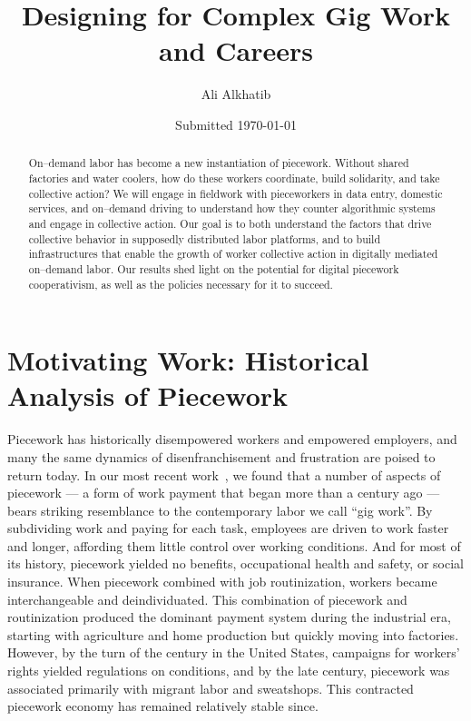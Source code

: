 \documentclass{article}
\title{Designing for Complex Gig Work and Careers}
\author{Ali Alkhatib}
\date{Submitted \today}
\newcommand{\topic}[1]{{\color{Blue}#1}}
\begin{document}
  \begin{abstract}
On--demand labor has become a new instantiation of piecework.
Without shared factories and water coolers,
how do these workers coordinate,
build solidarity,
and take collective action?
We will engage in fieldwork with pieceworkers in data entry,
domestic services,
and on--demand driving to understand how they counter algorithmic systems and engage in collective action.
Our goal is to both understand the factors that drive collective behavior in supposedly distributed labor platforms,
and to build infrastructures that enable the growth of worker collective action in digitally mediated on--demand labor.
Our results shed light on the potential for digital piecework cooperativism,
as well as the policies necessary for it to succeed. %
  \end{abstract}


\section*{Motivating Work: Historical Analysis of Piecework}
\topic{Piecework has historically disempowered workers and empowered employers, and
many the same dynamics of disenfranchisement and frustration are poised to return today.}
In our most recent work~\cite{pieceworkCrowdworkGigwork}, we found that a number of aspects of piecework
--- a form of work payment that began more than a century ago ---
bears striking resemblance to the contemporary labor we call ``gig work''.
By subdividing work and paying for each task, employees are driven to work faster and longer,
affording them little control over working conditions.
And for most of its history, piecework yielded no benefits, occupational health and safety, or social insurance.
When piecework combined with job routinization, workers became interchangeable and deindividuated.
This combination of piecework and routinization produced the dominant payment system during the industrial era,
starting with agriculture and home production but quickly moving into factories.
However, by the turn of the  century in the United States,
campaigns for workers' rights yielded regulations on conditions, and by the late  century,
piecework was associated primarily with migrant labor and sweatshops.
This contracted piecework economy has remained relatively stable since.
\end{document}
